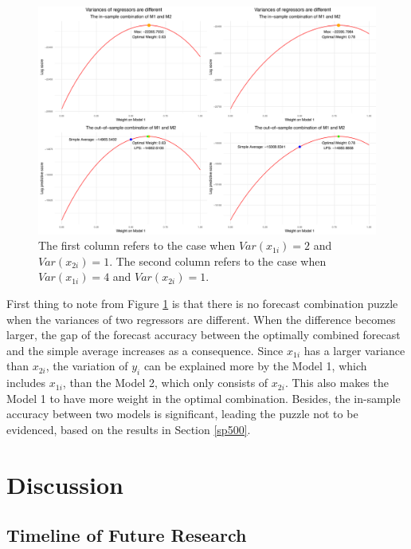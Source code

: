 \documentclass{monashthesis}
\begin{document}
\begin{figure}[ht]
\centering
\includegraphics[scale=0.55]{figures/x_var.png}
\caption{The first column refers to the case when $Var(x_{1i}) = 2$ and $Var(x_{2i}) = 1$. The second column refers to the case when $Var(x_{1i}) = 4$ and $Var(x_{2i}) = 1$.}
\label{fig:xvar}
\end{figure}

First thing to note from Figure \ref{fig:xvar} is that there is no forecast combination puzzle when the variances of two regressors are different. When the difference becomes larger, the gap of the forecast accuracy between the optimally combined forecast and the simple average increases as a consequence. Since \(x_{1i}\) has a larger variance than \(x_{2i}\), the variation of \(y_i\) can be explained more by the Model 1, which includes \(x_{1i}\), than the Model 2, which only consists of \(x_{2i}\). This also makes the Model 1 to have more weight in the optimal combination. Besides, the in-sample accuracy between two models is significant, leading the puzzle not to be evidenced, based on the results in Section \ref{sp500}.

\hypertarget{discussion}{%
\chapter{Discussion}\label{discussion}}

\hypertarget{section}{%
\section{}\label{section}}

\hypertarget{timeline-of-future-research}{%
\section{Timeline of Future Research}\label{timeline-of-future-research}}
\end{document}
